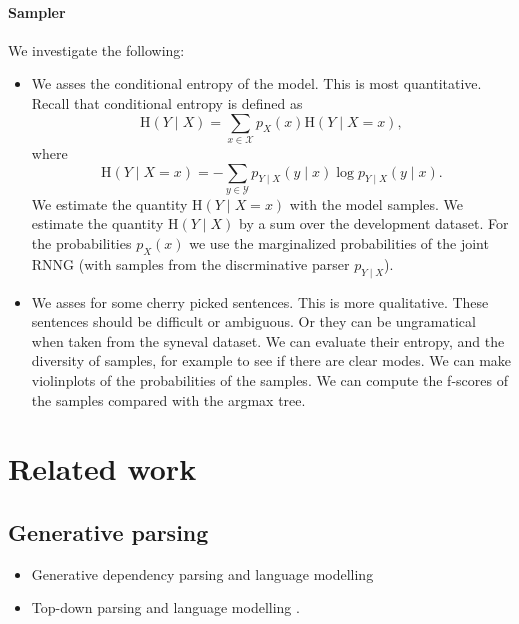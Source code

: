 \paragraph{Sampler} We investigate the following:
\begin{itemize}
  \item We asses the conditional entropy of the model. This is most quantitative. Recall that conditional entropy is defined as
  \begin{equation}
    \text{H}(Y \mid X) = \sum_{x \in \mathcal{X}} p_X(x)\text{H}(Y \mid X = x),
  \end{equation}
  where
  \begin{equation}
    \text{H}(Y \mid X = x) = - \sum_{y \in \mathcal{Y}} p_{Y \mid X}(y \mid x) \log p_{Y \mid X}(y \mid x).
  \end{equation}
  We estimate the quantity $\text{H}(Y \mid X = x)$ with the model samples. We estimate the quantity $\text{H}(Y \mid X)$ by a sum over the development dataset. For the probabilities $p_X(x)$ we use the marginalized probabilities of the joint RNNG (with samples from the discrminative parser $p_{Y \mid X}$).
  \item We asses for some cherry picked sentences. This is more qualitative. These sentences should be difficult or ambiguous. Or they can be ungramatical when taken from the syneval dataset. We can evaluate their entropy, and the diversity of samples, for example to see if there are clear modes. We can make violinplots of the probabilities of the samples. We can compute the f-scores of the samples compared with the argmax tree.
\end{itemize}

\section{Related work}

\subsection{Generative parsing}
\begin{itemize}
  \item Generative dependency parsing and language modelling \citep{titov2007generative,buys2015bayesian,buys2015generative,buys2018exact}
  \item Top-down parsing and language modelling \citep{roark2001probabilistic}.
\end{itemize}

